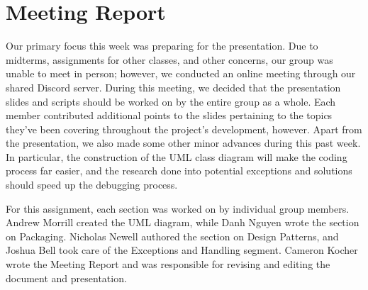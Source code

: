 \documentclass[12pt]{article}
\begin{document}
\section{Meeting Report}
\begin{flushleft}
Our primary focus this week was preparing for the presentation. Due to midterms, assignments for other classes, and other concerns, our group was unable to meet in person; however, we conducted an online meeting through our shared Discord server. During this meeting, we decided that the presentation slides and scripts should be worked on by the entire group as a whole. Each member contributed additional points to the slides pertaining to the topics they've been covering throughout the project's development, however. Apart from the presentation, we also made some other minor advances during this past week. In particular, the construction of the UML class diagram will make the coding process far easier, and the research done into potential exceptions and solutions should speed up the debugging process.
\end{flushleft}
\begin{flushleft}
For this assignment, each section was worked on by individual group members. Andrew Morrill created the UML diagram, while Danh Nguyen wrote the section on Packaging. Nicholas Newell authored the section on Design Patterns, and Joshua Bell took care of the Exceptions and Handling segment. Cameron Kocher wrote the Meeting Report and was responsible for revising and editing the document and presentation.
\end{flushleft}
\end{document}
